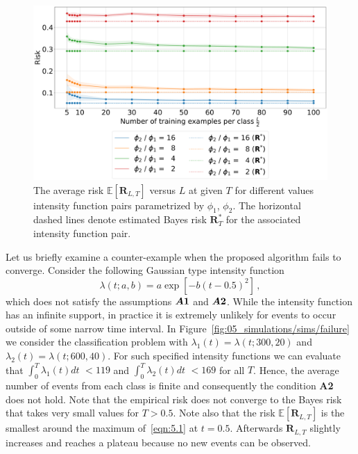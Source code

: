 \documentclass[lettersize,journal,onecolumn]{IEEEtran}
\theoremstyle{definition}
\newcommand{\figurewidth}{0.5\columnwidth}  %
\renewcommand{\figurename}{Figure}
\newcommand{\E}[1]{\mathbb{E}\left[#1\right]}
\newcommand{\assumption}[1]{{\rm \boldsymbol{A#1}}}
\begin{document}
\begin{figure}[!t]
	\includegraphics[width=\figurewidth]{pawla5}
	\centering
	\caption{
		The average risk $\mathbb{E}[\mathbf{R}_{L,T}]$ versus $L$ at given $T$ for 
		different values intensity function pairs parametrized by $\phi_{1}$,\enspace 
		$\phi_{2}$. The horizontal dashed lines denote estimated Bayes risk 
		$\mathbf{R}^{*}_{T}$ for the associated intensity function pair.
	}
	\label{fig:05_simulations/sims/examples}
\end{figure}

Let us briefly examine a counter-example when the proposed algorithm fails to converge.
Consider the following Gaussian type intensity function
\begin{equation}
	\lambda(t; a,b) = a \exp \left[-b\left(t-0.5\right)^{2}\right]
	\label{eqn:5.1} \,,
\end{equation}
which does not satisfy the assumptions $\assumption{1}$ and $\assumption{2}$.
While the intensity function has an infinite support, in practice it is extremely 
unlikely for events to occur outside of some narrow time interval. 
In \figurename~\ref{fig:05_simulations/sims/failure} we consider the classification
problem with \mbox{$\lambda_{1}(t)=\lambda\left(t; 300, 20\right)$} and
\mbox{$\lambda_{2}(t)=\lambda\left(t; 600, 40\right)$}.  For such specified intensity
functions we can evaluate that $\int_{0}^{T} \lambda_1(t)dt$ $< 119$ and
$\int_{0}^{T} \lambda_2(t)dt$  $< 169$ for all $T$.
Hence, the average number of events from each class is finite and consequently
the condition {\bf A2} does not hold. Note that the empirical risk
does not converge to the Bayes risk that takes very small values for $T > 0.5$. 
Note also that the risk $\E{\mathbf{R}_{L,T}}$ is the smallest around the maximum
of~\eqref{eqn:5.1} at
$t=0.5$. Afterwards $\mathbf{R}_{L,T}$ slightly increases and reaches a plateau because 
no new events can be observed.
\end{document}
